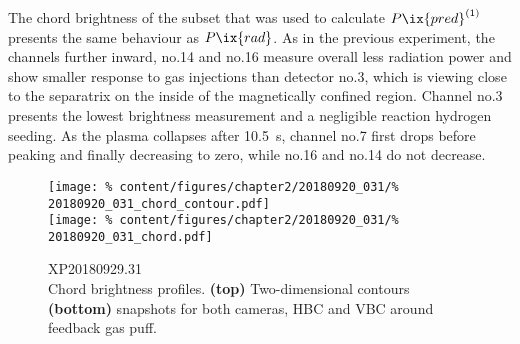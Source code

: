             The chord brightness of the subset that was used to calculate $P\ix{pred}^{\left(1\right)}$ presents the same behaviour as $P\ix{rad}$. As in the previous experiment, the channels further inward, no.14 and no.16 measure overall less radiation power and show smaller response to gas injections than detector no.3, which is viewing close to the separatrix on the inside of the magnetically confined region. Channel no.3 presents the lowest brightness measurement and a negligible reaction hydrogen seeding. As the plasma collapses after \SI{10.5}{\second}, channel no.7 first drops before peaking and finally decreasing to zero, while no.16 and no.14 do not decrease.\\%
%
            \begin{figure}[t]%
                \centering%
                \texttt{[image: \%
                    content/figures/chapter2/20180920\_031/\%
                    20180920\_031\_chord\_contour.pdf]}\\%
                \texttt{[image: \%
                    content/figures/chapter2/20180920\_031/\%
                    20180920\_031\_chord.pdf]}\\%
                \caption{%
                    XP20180929.31\\%
                    Chord brightness profiles. \textbf{(top)} Two-dimensional contours \textbf{(bottom)} snapshots for both cameras, HBC and VBC around feedback gas puff.}\label{fig:20180920.31_CP}%
            \end{figure}%
%
